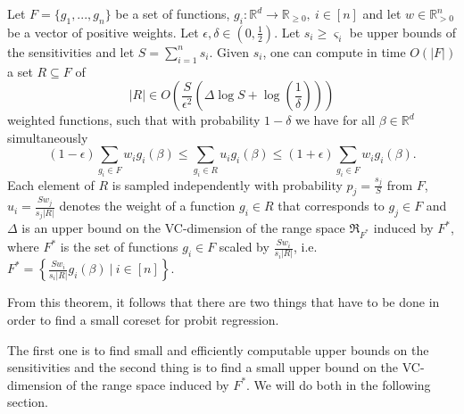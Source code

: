\begin{theorem}
    \label{theorem:sensitivity-framework}
    Let $F = \{ g_1, ..., g_n \}$ be a set of functions,
    $g_i: \mathbb{R}^d \rightarrow \mathbb{R}_{\geq 0}, \ i \in [n]$
    and let $w \in \mathbb{R}^n_{>0}$ be a vector of positive weights.
    Let $\epsilon, \delta \in (0, \frac{1}{2})$.
    Let $s_i \geq \varsigma_i$ be upper bounds of the sensitivities and
    let $S = \sum_{i=1}^n s_i$.
    Given $s_i$, one can compute in time $O(|F|)$ a set
    $R \subseteq F$ of
    \begin{equation*}
        |R| \in O \left( \frac{S}{\epsilon^2} \left( \Delta \log S + \log \left( \frac{1}{\delta} \right) \right) \right)
    \end{equation*}
    weighted functions, such that with probability $1 - \delta$ we have
    for all $\beta \in \mathbb{R}^d$ simultaneously
    \begin{equation*}
        (1-\epsilon) \sum_{g_i \in F} w_i g_i(\beta) \leq \sum_{g_i \in R} u_i g_i(\beta) \leq (1 + \epsilon) \sum_{g_i \in F} w_i g_i(\beta).
    \end{equation*}
    Each element of $R$ is sampled independently with probability
    $p_j = \frac{s_j}{S}$ from $F$, $u_i = \frac{S w_j}{s_j |R|}$
    denotes the weight of a function $g_i \in R$ that corresponds to
    $g_j \in F$ and $\Delta$ is an upper bound on the
    VC-dimension of the range space $\mathfrak{R}_{F^\ast}$ induced by
    $F^\ast$, where $F^\ast$ is the set of functions $g_i \in F$
    scaled by $\frac{S w_i}{s_i |R|}$, i.e.
    $F^\ast = \left\{ \frac{S w_i}{s_i |R|} g_i(\beta) \ |\ i \in [n] \right\}$.
\end{theorem}

From this theorem, it follows that there are two things that have to be
done in order to find a small coreset for probit regression.

The first one is to find small and efficiently computable upper bounds
on the sensitivities and the second thing is to find a
small upper bound on the VC-dimension of the range space induced by $F^\ast$.
We will do both in the following section.